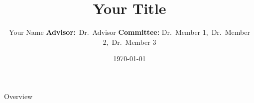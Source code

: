 \documentclass[
  usepdftitle=false,
]{beamer}
\title{Your Title}
\author{
  \normalsize Your Name
  \newline
  \small
  \textbf{Advisor:}\ Dr.\ Advisor
  \newline
  \textbf{Committee:}
  Dr.\ Member 1,\
  Dr.\ Member 2,\
  Dr.\ Member 3
  \newline
}
\date{\today}
\institute{Case Western Reserve University}
\begin{document}
\maketitle
\begin{frame}{Overview}
  \tableofcontents
\end{frame}





\appendix

\end{document}
